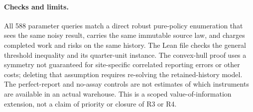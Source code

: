 \documentclass[11pt]{article}
\begin{document}
\paragraph{Checks and limits.}
All 588 parameter queries match a direct robust pure-policy enumeration that sees the same noisy result, carries the same immutable source law, and charges completed work and risks on the same history. The Lean file checks the general threshold inequality and its quarter-unit instance. The convex-hull proof uses a symmetry not guaranteed for site-specific correlated reporting errors or other costs; deleting that assumption requires re-solving the retained-history model. The perfect-report and no-assay controls are not estimates of which instruments are available in an actual warehouse. This is a scoped value-of-information extension, not a claim of priority or closure of R3 or R4.
\end{document}
